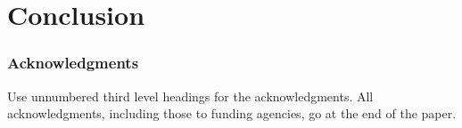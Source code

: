 \documentclass{article} %
\begin{document}


%

\section{Conclusion}


\subsubsection*{Acknowledgments}

Use unnumbered third level headings for the acknowledgments. All
acknowledgments, including those to funding agencies, go at the end of the paper.


\end{document}

